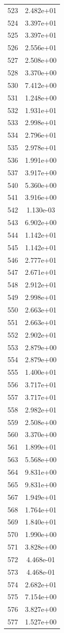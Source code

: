 \documentclass[12pt]{article}
\begin{document}
\begin{longtable}{@{}cc@{}}
523 & 2.482e+01 \\
524 & 3.397e+01 \\
525 & 3.397e+01 \\
526 & 2.556e+01 \\
527 & 2.508e+00 \\
528 & 3.370e+00 \\
530 & 7.412e+00 \\
531 & 1.248e+00 \\
532 & 1.931e+01 \\
533 & 2.998e+01 \\
534 & 2.796e+01 \\
535 & 2.978e+01 \\
536 & 1.991e+00 \\
537 & 3.917e+00 \\
540 & 5.360e+00 \\
541 & 3.916e+00 \\
542 & 1.130e-03 \\
543 & 6.902e+00 \\
544 & 1.142e+01 \\
545 & 1.142e+01 \\
546 & 2.777e+01 \\
547 & 2.671e+01 \\
548 & 2.912e+01 \\
549 & 2.998e+01 \\
550 & 2.663e+01 \\
551 & 2.663e+01 \\
552 & 2.902e+01 \\
553 & 2.879e+00 \\
554 & 2.879e+00 \\
555 & 1.400e+01 \\
556 & 3.717e+01 \\
557 & 3.717e+01 \\
558 & 2.982e+01 \\
559 & 2.508e+00 \\
560 & 3.370e+00 \\
561 & 1.899e+01 \\
563 & 5.568e+00 \\
564 & 9.831e+00 \\
565 & 9.831e+00 \\
567 & 1.949e+01 \\
568 & 1.764e+01 \\
569 & 1.840e+01 \\
570 & 1.990e+00 \\
571 & 3.828e+00 \\
572 & 4.468e-01 \\
573 & 4.468e-01 \\
574 & 2.682e+01 \\
575 & 7.154e+00 \\
576 & 3.827e+00 \\
577 & 1.527e+00 \\

\bottomrule
\end{longtable}
\end{document}
